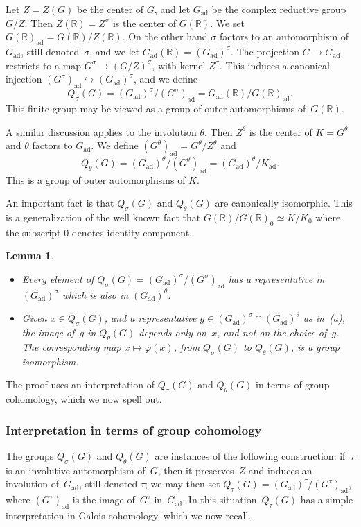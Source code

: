 \documentclass[10pt,leqno]{article}
\newtheorem{lemma}[equation]{Lemma}
\newcommand{\ad}{\mathrm{ad}}
\newcommand{\Gad}{G_\mathrm{ad}}
\newcommand{\Kad}{K_\mathrm{ad}}
\newcommand{\R}{\mathbb R}
\newcommand{\G}{G}
\begin{document}
Let $Z=Z(G)$ be the center of $G$, and let $\Gad$ be the complex reductive group~$G/Z$.
Then $Z(\R)=Z^\sigma$ is the center of $G(\R)$. We set $\G(\R)_\ad=G(\R)/Z(\R)$.
On the other hand  $\sigma$ factors to an automorphism  of $\Gad$, still denoted~$\sigma$, and we let  $\Gad(\R)=(\Gad)^\sigma$.
The projection $G\rightarrow \Gad$ restricts to a map $G^\sigma\rightarrow (G/Z)^\sigma$, with kernel $Z^\sigma$.
This induces a canonical injection $(G^\sigma)_\ad\hookrightarrow (\Gad)^\sigma$, and we define
$$
Q_\sigma(G)=(\Gad)^\sigma/(G^\sigma)_\ad=\Gad(\R)/\G(\R)_\ad.
$$
This finite group may be viewed as a group of outer automorphisms of~$G(\R)$.

A similar discussion applies to the involution $\theta$.
Then $Z^\theta$ is the center of $K=G^\theta$ and  $\theta$ factors to $\Gad$.
We define $(G^\theta)_\ad=G^\theta/Z^\theta$ and
$$
Q_\theta(G)=(\Gad)^\theta/(G^\theta)_\ad =(\Gad)^\theta/\Kad.
$$
This is a group of outer automorphisms of $K$. 

An important fact is that $Q_\sigma(G)$ and $Q_\theta(G)$ are canonically isomorphic. This is a generalization of the well known fact that
$G(\R)/G(\R)_0\simeq K/K_0$ where the subscript $0$ denotes identity component. 

\begin{lemma}\label{lem:iso_q}
\begin{itemize}
\item[(a)] 
Every element of $Q_\sigma(G)=(\Gad)^\sigma/(G^\sigma)_\ad$ has a representative in $(\Gad)^\sigma$ which is also in $(\Gad)^\theta$.
\item[(b)] Given $x \in Q_{\sigma}(G)$, and a representative $g\in (\Gad)^\sigma \cap (\Gad)^\theta$ as in~(a), the image of~$g$ in  $Q_\theta(G)$ depends only on~$x$, and not on  the choice of~$g$. The corresponding map $x \mapsto \varphi(x)$, from $Q_{\sigma}(G)$ to $Q_{\theta}(G)$, is a group isomorphism. 
\end{itemize}
\end{lemma}


The proof uses an interpretation of $Q_\sigma(G)$ and $Q_\theta(G)$ in terms of group cohomology, which we now spell out. 

\subsubsection{Interpretation in terms of group cohomology}

The groups $Q_{\sigma}(G)$ and $Q_{\theta}(G)$ are instances of the following construction: if~$\tau$ is an involutive automorphism of~$G$, then it preserves~$Z$ and induces an involution of~$\Gad$, still denoted $\tau$; we may then set $Q_{\tau}(G)=(\Gad)^{\tau}/(G^{\tau})_{\ad}$, where $(G^{\tau})_{\ad}$ is the image of~$G^{\tau}$ in~$\Gad$. In this situation~$Q_{\tau}(G)$ has a simple interpretation in Galois cohomology, which we now recall. 
\end{document}
